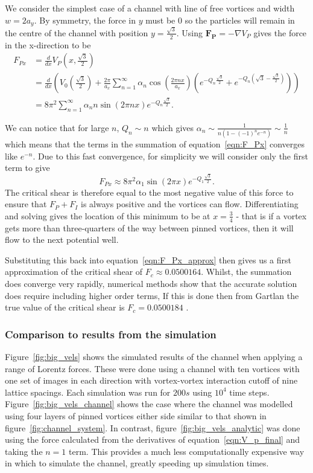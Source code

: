 \documentclass{article}
\numberwithin{equation}{section}
\begin{document}
We consider the simplest case of a channel with line of free vortices and width $w=2a_y$. By symmetry, the force in $y$ must be $0$ so the particles will remain in the centre of the channel with position $y=\frac{\sqrt{3}}{2}$.
Using $\mathbf{F_P} = -\nabla V_P$ gives the force in the x-direction to be
\begin{align}
    F_{Px} &= \frac{d}{dx}V_P(x, \frac{\sqrt{3}}{2}) \nonumber \\
    &= \frac{d}{dx}\left(V_0\left(\frac{\sqrt{3}}{2}\right) + \frac{2\pi}{a_x}\sum_{n=1}^\infty\alpha_n\cos\left(\frac{2\pi nx}{a_x}\right) \left(e^{-Q_n\frac{\sqrt{3}}{2}}+e^{-Q_n(\sqrt{3}-\frac{\sqrt{3}}{2})}\right)\right) \nonumber \\
    &= 8\pi^2\sum_{n=1}^\infty\alpha_nn\sin(2\pi nx) e^{-Q_n\frac{\sqrt{3}}{2}}. \label{eqn:F_Px}
\end{align}

We can notice that for large $n$, $Q_n\sim n$ which gives $\alpha_n\sim \frac{1}{n(1-(-1)^ne^{-n})}\sim\frac{1}{n}$ which means that the terms in the summation of equation~\ref{eqn:F_Px} converges like $e^{-n}$. Due to this fast convergence, for simplicity we will consider only the first term to give
\begin{equation}
    F_{Px} \approx 8\pi^2\alpha_1\sin(2\pi x) e^{-Q_1\frac{\sqrt{3}}{2}}. \label{eqn:F_Px_approx}
\end{equation}
The critical shear is therefore equal to the most negative value of this force to ensure that $F_P + F_I$ is always positive and the vortices can flow. Differentiating and solving gives the location of this minimum to be at $x=\frac{3}{4}$ - that is if a vortex gets more than three-quarters of the way between pinned vortices, then it will flow to the next potential well.

Substituting this back into equation~\ref{eqn:F_Px_approx} then gives us a first approximation of the critical shear of $F_c \approx 0.0500164$. Whilst, the summation does converge very rapidly, numerical methods show that the accurate solution does require including higher order terms, If this is done then from Gartlan the true value of the critical shear is $F_c = 0.0500184$ \cite{Gartlan2020NovelFibres}.

\subsubsection{Comparison to results from the simulation}
Figure~\ref{fig:big_vels} shows the simulated results of the channel when applying a range of Lorentz forces. These were done using a channel with ten vortices with one set of images in each direction with vortex-vortex interaction cutoff of nine lattice spacings. Each simulation was run for $200s$ using $10^4$ time steps. Figure~\ref{fig:big_vels_channel} shows the case where the channel was modelled using four layers of pinned vortices either side similar to that shown in figure~\ref{fig:channel_system}. In contrast, figure~\ref{fig:big_vels_analytic} was done using the force calculated from the derivatives of equation~\ref{eqn:V_p_final} and taking the $n=1$ term. This provides a much less computationally expensive way in which to simulate the channel, greatly speeding up simulation times.
\end{document}
